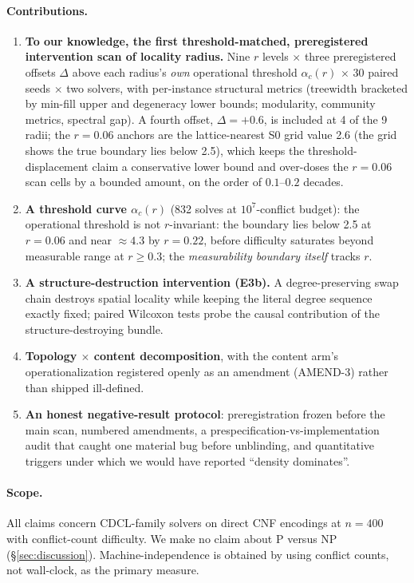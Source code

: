 \documentclass[11pt]{article}
\newcommand{\ac}[1]{\ensuremath{\alpha_c(#1)}}
\begin{document}
\paragraph{Contributions.}
\begin{enumerate}
\item \textbf{To our knowledge, the first threshold-matched, preregistered
intervention scan of locality radius.}
Nine $r$ levels $\times$ three preregistered offsets $\Delta$ above each radius's
\emph{own} operational threshold $\ac{r}$ $\times$ 30 paired seeds $\times$ two
solvers, with per-instance structural metrics (treewidth bracketed by min-fill
upper and degeneracy lower bounds; modularity, community metrics, spectral
gap). A fourth offset, $\Delta{=}{+}0.6$, is included at 4 of the 9 radii; the
$r{=}0.06$ anchors are the lattice-nearest S0 grid value 2.6 (the grid shows
the true boundary lies below 2.5), which keeps the threshold-displacement
claim a conservative lower bound and over-doses the $r{=}0.06$ scan cells by
a bounded amount, on the order of $0.1$--$0.2$ decades.
\item \textbf{A threshold curve $\ac{r}$} (832 solves at $10^7$-conflict
budget): the operational threshold is not $r$-invariant: the boundary lies below
2.5 at $r=0.06$ and near ${\approx}4.3$ by $r=0.22$, before difficulty
saturates beyond measurable range at $r\ge0.3$; the \emph{measurability
boundary itself} tracks $r$.
\item \textbf{A structure-destruction intervention (E3b).} A degree-preserving
swap chain destroys spatial locality while keeping the literal degree sequence
exactly fixed; paired Wilcoxon tests probe the causal contribution of the
structure-destroying bundle.
\item \textbf{Topology $\times$ content decomposition}, with the content arm's
operationalization registered openly as an amendment (AMEND-3) rather than
shipped ill-defined.
\item \textbf{An honest negative-result protocol}: preregistration frozen
before the main scan, numbered amendments, a prespecification-vs-implementation
audit that caught one material bug before unblinding, and quantitative
triggers under which we would have reported ``density dominates''.
\end{enumerate}

\paragraph{Scope.}
All claims concern CDCL-family solvers on direct CNF encodings at $n=400$ with
conflict-count difficulty. We make no claim about \textsc{P} versus
\textsc{NP} (\S\ref{sec:discussion}). Machine-independence is obtained by
using conflict counts, not wall-clock, as the primary measure.
\end{document}
